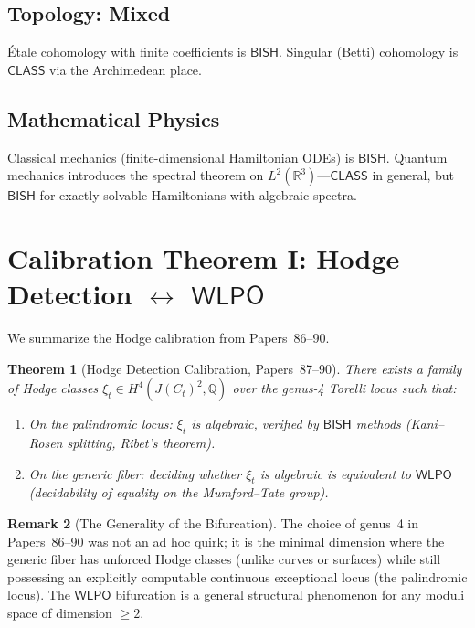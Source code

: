 \documentclass[11pt,a4paper]{article}
\theoremstyle{plain}
\newtheorem{theorem}{Theorem}[section]
\theoremstyle{definition}
\newtheorem{remark}[theorem]{Remark}
\newcommand{\BISH}{\textsf{BISH}}
\newcommand{\WLPO}{\textsf{WLPO}}
\newcommand{\CLASS}{\textsf{CLASS}}
\newcommand{\Q}{\mathbb{Q}}
\newcommand{\R}{\mathbb{R}}
\begin{document}
\subsection{Topology: Mixed}

\'Etale cohomology with finite coefficients is $\BISH$. Singular (Betti) cohomology is $\CLASS$ via the Archimedean place. 

\subsection{Mathematical Physics}

Classical mechanics (finite-dimensional Hamiltonian ODEs) is $\BISH$. Quantum mechanics introduces the spectral theorem on $L^2(\R^3)$---$\CLASS$ in general, but $\BISH$ for exactly solvable Hamiltonians with algebraic spectra.


\section{Calibration Theorem I: Hodge Detection $\leftrightarrow$ $\WLPO$}\label{sec:hodge}

We summarize the Hodge calibration from Papers~86--90.

\begin{theorem}[Hodge Detection Calibration, Papers~87--90]\label{thm:hodge-cal}
There exists a family of Hodge classes $\xi_t \in H^4(J(C_t)^2, \Q)$ over the genus-4 Torelli locus such that:
\begin{enumerate}[label=(\roman*)]
\item On the palindromic locus: $\xi_t$ is algebraic, verified by $\BISH$ methods (Kani--Rosen splitting, Ribet's theorem).
\item On the generic fiber: deciding whether $\xi_t$ is algebraic is equivalent to $\WLPO$ (decidability of equality on the Mumford--Tate group).
\end{enumerate}
\end{theorem}

\begin{remark}[The Generality of the Bifurcation]\label{rem:hodge_genus}
The choice of genus~4 in Papers~86--90 was not an ad hoc quirk; it is the minimal dimension where the generic fiber has unforced Hodge classes (unlike curves or surfaces) while still possessing an explicitly computable continuous exceptional locus (the palindromic locus). The $\WLPO$ bifurcation is a general structural phenomenon for any moduli space of dimension $\geq 2$.
\end{remark}
\end{document}
